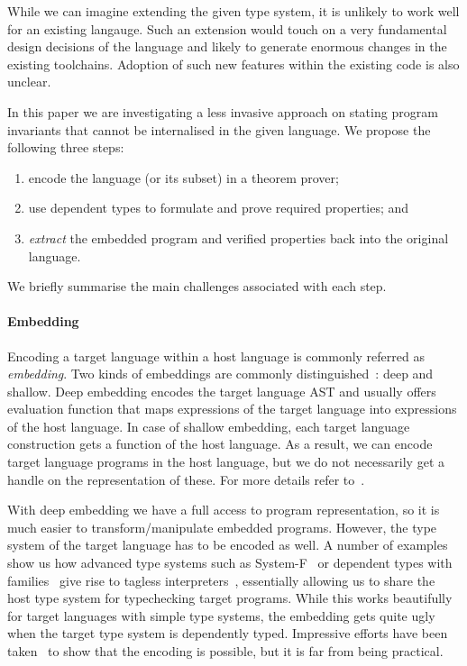 \documentclass[acmsmall,review,anonymous]{acmart}\settopmatter{printfolios=true,printccs=false,printacmref=false}
\begin{document}
While we can imagine extending the given type system, it is unlikely to work
well for an existing langauge.  Such an extension would touch on a very fundamental
design decisions of the language and likely to generate enormous changes in the
existing toolchains.  Adoption of such new features within the existing code
is also unclear.

In this paper we are investigating a less invasive approach on stating program
invariants that cannot be internalised in the given language.  We propose the
following three steps:
\begin{enumerate}
        \item encode the language (or its subset) in a theorem prover;
        \item use dependent types to formulate and prove required properties;
                and
        \item \emph{extract} the embedded program and verified properties back
                into the original language.
\end{enumerate}


We briefly summarise the main challenges associated with each step.

\paragraph{Embedding}
Encoding a target language within a host language is commonly referred as 
\emph{embedding}.
Two kinds of embeddings are commonly distinguished~\cite{}: deep and shallow.
Deep embedding encodes the target language AST and usually offers evaluation
function that maps expressions of the target language into expressions
of the host language.  In case of shallow embedding, each target language
construction gets a function of the host language.  As a result, we can encode
target language programs in the host language, but we do not necessarily get
a handle on the representation of these.  For more details refer to~\cite{}.

With deep embedding we have a full access to program representation, so it is
much easier to transform/manipulate embedded programs.  However, the type system
of the target language has to be encoded as well.  A number
of examples~\cite{} show us how advanced type systems such as
System-F~\cite{} or dependent types with families~\cite{} give rise to tagless 
interpreters~\cite{}, essentially allowing us to share the host type system for
typechecking target programs.  While this works beautifully for target languages with
simple type systems, the embedding gets quite ugly~\cite{} when the target type
system is dependently typed.  Impressive efforts have been taken~\cite{} to show
that the encoding is possible, but it is far from being practical.
\end{document}
